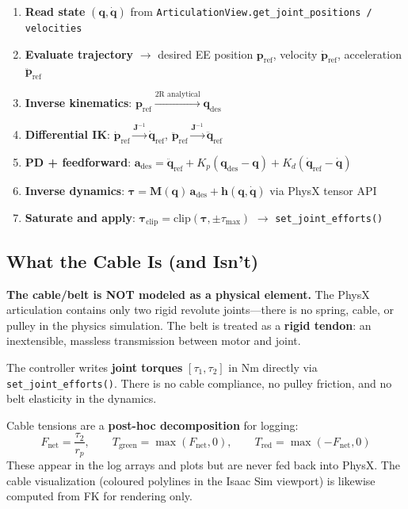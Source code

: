 \documentclass[11pt,a4paper]{article}
\newcommand{\bq}{\bm{q}}
\newcommand{\btau}{\bm{\tau}}
\newcommand{\bM}{\bm{M}}
\newcommand{\bh}{\bm{h}}
\newcommand{\bJ}{\bm{J}}
\begin{document}
\begin{enumerate}[leftmargin=2em]
    \item \textbf{Read state} $(\bq, \dot{\bq})$ from \texttt{ArticulationView.get\_joint\_positions / velocities}
    \item \textbf{Evaluate trajectory} $\to$ desired EE position $\bm{p}_{\mathrm{ref}}$, velocity $\dot{\bm{p}}_{\mathrm{ref}}$, acceleration $\ddot{\bm{p}}_{\mathrm{ref}}$
    \item \textbf{Inverse kinematics}: $\bm{p}_{\mathrm{ref}} \xrightarrow{\text{2R analytical}} \bq_{\mathrm{des}}$
    \item \textbf{Differential IK}: $\dot{\bm{p}}_{\mathrm{ref}} \xrightarrow{\bJ^{-1}} \dot{\bq}_{\mathrm{ref}}$, \quad $\ddot{\bm{p}}_{\mathrm{ref}} \xrightarrow{\bJ^{-1}} \ddot{\bq}_{\mathrm{ref}}$
    \item \textbf{PD + feedforward}: $\bm{a}_{\mathrm{des}} = \ddot{\bq}_{\mathrm{ref}} + K_p(\bq_{\mathrm{des}} - \bq) + K_d(\dot{\bq}_{\mathrm{ref}} - \dot{\bq})$
    \item \textbf{Inverse dynamics}: $\btau = \bM(\bq)\,\bm{a}_{\mathrm{des}} + \bh(\bq, \dot{\bq})$ \quad via PhysX tensor API
    \item \textbf{Saturate and apply}: $\btau_{\mathrm{clip}} = \mathrm{clip}(\btau, \pm\tau_{\max})$ $\to$ \texttt{set\_joint\_efforts()}
\end{enumerate}

\subsection{What the Cable Is (and Isn't)}

\begin{warnbox}
\textbf{The cable/belt is NOT modeled as a physical element.}  The PhysX articulation contains only two rigid revolute joints---there is no spring, cable, or pulley in the physics simulation.  The belt is treated as a \textbf{rigid tendon}: an inextensible, massless transmission between motor and joint.
\end{warnbox}

The controller writes \textbf{joint torques} $[\tau_1, \tau_2]$ in Nm directly via \texttt{set\_joint\_efforts()}.  There is no cable compliance, no pulley friction, and no belt elasticity in the dynamics.

Cable tensions are a \textbf{post-hoc decomposition} for logging:
\[
    F_{\mathrm{net}} = \frac{\tau_2}{r_p}, \qquad
    T_{\mathrm{green}} = \max(F_{\mathrm{net}}, 0), \qquad
    T_{\mathrm{red}} = \max(-F_{\mathrm{net}}, 0)
\]
These appear in the log arrays and plots but are never fed back into PhysX.  The cable visualization (coloured polylines in the Isaac Sim viewport) is likewise computed from FK for rendering only.
\end{document}
